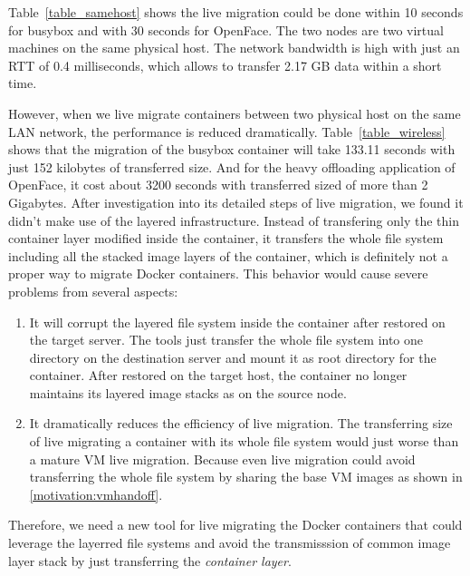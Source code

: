 Table~\ref{table_samehost} shows the live migration could be done within 10 seconds for busybox and with 30 seconds for OpenFace. The two nodes are two virtual machines on the same physical host. The network bandwidth is high with just an RTT of 0.4 milliseconds, which allows to transfer 2.17 GB data within a short time.



However, when we live migrate containers between two physical host on the same LAN network, the performance is reduced dramatically. Table~\ref{table_wireless} shows that the migration of the busybox container will take 133.11 seconds with just 152 kilobytes of transferred size. And for the heavy offloading application of OpenFace, it cost about 3200 seconds with transferred sized of more than 2 Gigabytes. After investigation into its detailed steps of live migration, we found it didn't make use of the layered infrastructure. Instead of transfering only the thin container layer modified inside the container, it transfers the whole file system including all the stacked image layers of the container, which is definitely not a proper way to migrate Docker containers.  This behavior would cause severe problems from several aspects:
\begin{enumerate}[series = tobecont]
    \item It will corrupt the layered file system inside the container after restored  on the target server. The tools just transfer the whole file system into one directory on the destination server and mount it as root directory for the container. After restored on the target host, the container no longer maintains its layered image stacks as on the source node. 
    \item It dramatically reduces the efficiency of live migration. The transferring size of live migrating a container with its whole file system would just worse than a mature VM live migration. Because even live migration could avoid transferring the whole file system by sharing the base VM images as shown in \ref{motivation:vmhandoff}. 
\end{enumerate}
Therefore, we need a new tool for live migrating the Docker containers that could leverage the layerred file systems and avoid the transmisssion of common image layer stack by just transferring the \textit{container layer}.


